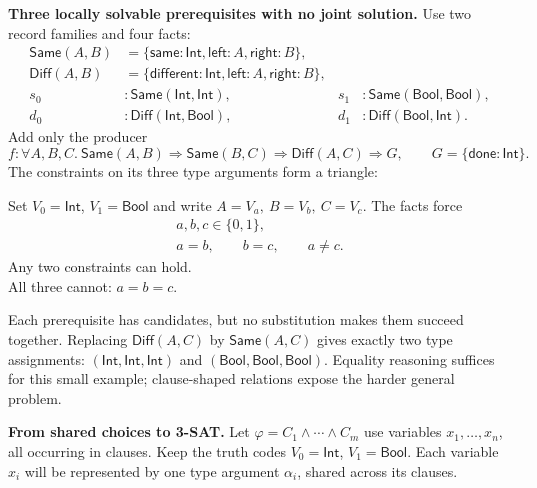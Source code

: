 \documentclass[10pt,a4paper]{article}
\newcommand{\Int}{\mathsf{Int}}
\newcommand{\Bool}{\mathsf{Bool}}
\newcommand{\kw}[1]{\mathsf{#1}}
\begin{document}
\textbf{Three locally solvable prerequisites with no joint solution.}
Use two record families and four facts:
\[
\begin{aligned}
 \kw{Same}(A,B)&=\{\kw{same}:\Int,\kw{left}:A,\kw{right}:B\},\\
 \kw{Diff}(A,B)&=\{\kw{different}:\Int,\kw{left}:A,\kw{right}:B\},\\
 s_0&:\kw{Same}(\Int,\Int),& s_1&:\kw{Same}(\Bool,\Bool),\\
 d_0&:\kw{Diff}(\Int,\Bool),& d_1&:\kw{Diff}(\Bool,\Int).
\end{aligned}
\]
Add only the producer
\[
 f:\forall A,B,C.\ \kw{Same}(A,B)\Rightarrow\kw{Same}(B,C)
                  \Rightarrow\kw{Diff}(A,C)\Rightarrow G,
 \qquad G=\{\kw{done}:\Int\}.
\]
The constraints on its three type arguments form a triangle:
\begin{center}
\begin{minipage}[c]{0.42\linewidth}
\centering
{}
\end{minipage}\hfill
\begin{minipage}[c]{0.54\linewidth}
Set $V_0=\Int$, $V_1=\Bool$ and write
$A=V_a,\ B=V_b,\ C=V_c$. The facts force
\[
 \begin{gathered}
 a,b,c\in\{0,1\},\\
 a=b,\qquad b=c,\qquad a\ne c.
 \end{gathered}
\]
Any two constraints can hold.\\
All three cannot: $a=b=c$.
\end{minipage}
\end{center}
Each prerequisite has candidates, but no substitution makes them succeed together.
Replacing $\kw{Diff}(A,C)$ by $\kw{Same}(A,C)$ gives exactly two type assignments:
$(\Int,\Int,\Int)$ and $(\Bool,\Bool,\Bool)$.
Equality reasoning suffices for this small example; clause-shaped relations expose
the harder general problem.

\newpage
\textbf{From shared choices to 3-SAT.}
Let $\varphi=C_1\land\cdots\land C_m$ use variables $x_1,\ldots,x_n$, all occurring
in clauses. Keep the truth codes $V_0=\Int$, $V_1=\Bool$. Each variable $x_i$
will be represented by one type argument $\alpha_i$, shared across its clauses.
\end{document}
